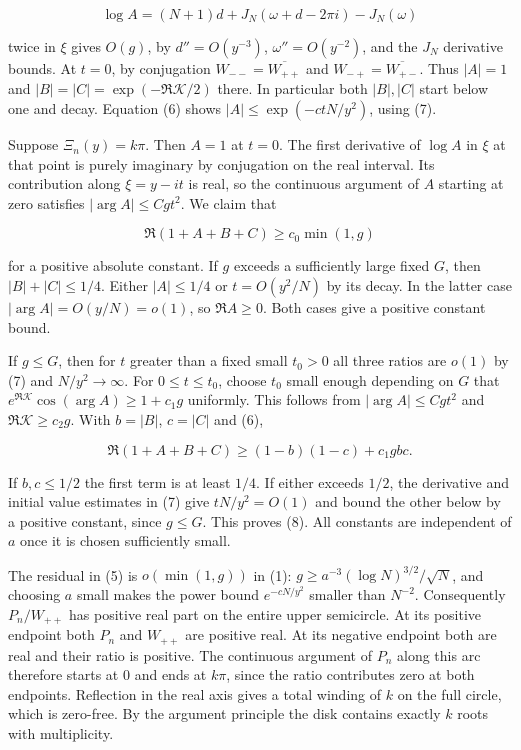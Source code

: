 \documentclass[11pt]{article}
\begin{document}
\[
\log A=(N+1)d+J_N(\omega+d-2\pi i)-J_N(\omega)
\]

twice in $\xi$ gives $O(g)$, by $d''=O(y^{-3})$, $\omega''=O(y^{-2})$, and the $J_N$ derivative bounds. At $t=0$, by conjugation $W_{--}=\overline{W_{++}}$ and $W_{-+}=\overline{W_{+-}}$. Thus $|A|=1$ and $|B|=|C|=\exp(-\Re\mathcal K/2)$ there. In particular both $|B|,|C|$ start below one and decay. Equation (6) shows $|A|\le\exp(-ctN/y^2)$, using (7).

Suppose $\Xi_n(y)=k\pi$. Then $A=1$ at $t=0$. The first derivative of $\log A$ in $\xi$ at that point is purely imaginary by conjugation on the real interval. Its contribution along $\xi=y-it$ is real, so the continuous argument of $A$ starting at zero satisfies $|\arg A|\le Cgt^2$. We claim that

\[
\Re(1+A+B+C)\ge c_0\min(1,g)
\tag{8}
\]

for a positive absolute constant. If $g$ exceeds a sufficiently large fixed $G$, then $|B|+|C|\le1/4$. Either $|A|\le1/4$ or $t=O(y^2/N)$ by its decay. In the latter case $|\arg A|=O(y/N)=o(1)$, so $\Re A\ge0$. Both cases give a positive constant bound.

If $g\le G$, then for $t$ greater than a fixed small $t_0>0$ all three ratios are $o(1)$ by (7) and $N/y^2\to\infty$. For $0\le t\le t_0$, choose $t_0$ small enough depending on $G$ that $e^{\Re\mathcal K}\cos(\arg A)\ge1+c_1g$ uniformly. This follows from $|\arg A|\le Cgt^2$ and $\Re\mathcal K\ge c_2 g$. With $b=|B|$, $c=|C|$ and (6),

\[
\Re(1+A+B+C)\ge (1-b)(1-c)+c_1g b c.
\]

If $b,c\le1/2$ the first term is at least $1/4$. If either exceeds $1/2$, the derivative and initial value estimates in (7) give $tN/y^2=O(1)$ and bound the other below by a positive constant, since $g\le G$. This proves (8). All constants are independent of $a$ once it is chosen sufficiently small.

The residual in (5) is $o(\min(1,g))$ in (1): $g\ge a^{-3} (\log N)^{3/2}/\sqrt N$, and choosing $a$ small makes the power bound $e^{-cN/y^2}$ smaller than $N^{-2}$. Consequently $P_n/W_{++}$ has positive real part on the entire upper semicircle. At its positive endpoint both $P_n$ and $W_{++}$ are positive real. At its negative endpoint both are real and their ratio is positive. The continuous argument of $P_n$ along this arc therefore starts at $0$ and ends at $k\pi$, since the ratio contributes zero at both endpoints. Reflection in the real axis gives a total winding of $k$ on the full circle, which is zero-free. By the argument principle the disk contains exactly $k$ roots with multiplicity.
\end{document}
